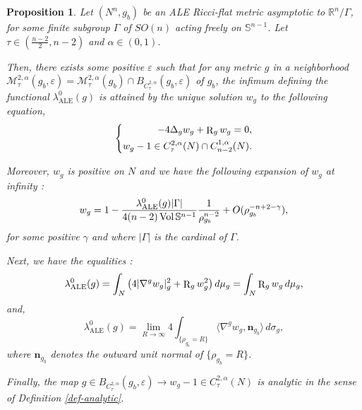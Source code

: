 \documentclass[a4paper,11pt,reqno]{amsart}
\newtheorem{prop}[defn]{Proposition}
\def\RR{\mathbb{R}}
\def\vol{\mathop{\rm vol}\nolimits}
\def\vol{\mathop{\rm Vol}\nolimits}
\def\vol{\mathop{\rm vol}\nolimits}
\def\vol{\mathop{\rm Vol}\nolimits}
\def\R{\mathop{\rm R}\nolimits}
\numberwithin{equation}{section}
\begin{document}
	\begin{prop}\label{existence propriete-wg} 
		Let $(N^n,g_b)$ be an ALE Ricci-flat metric asymptotic to $\RR^n\slash\Gamma$, for some finite subgroup $\Gamma$ of $SO(n)$ acting freely on $\mathbb{S}^{n-1}$. Let $\tau\in(\frac{n-2}{2},n-2)$ and $\alpha\in (0,1)$.
		
		Then, there exists some positive $\varepsilon$ such that for any metric $g$ in a neighborhood $\mathcal{M}^{2,\alpha}_{\tau}(g_b,\varepsilon)= \mathcal{M}^{2,\alpha}_{\tau}(g_b)\cap B_{C^{2,\alpha}_{\tau}}(g_b,\varepsilon)$ of $g_b$, the infimum defining the functional $\lambda_{\operatorname{ALE}}^0(g)$ is attained by the unique solution $w_g$ to the following equation,
		\begin{equation}
		\left\{
		\begin{aligned}
		-4\Delta_g w_g + \R_g w_g =0, \label{equ-criti-lambda}\\
		w_g-1 \in C^{2,\alpha}_{\tau}(N)\cap C^{1,\alpha}_{n-2}(N).
		\end{aligned}
		\right.
		\end{equation}
		
		Moreover, $w_g$ is positive on $N$ and we have the following expansion of $w_g$ at infinity :
		\begin{equation}
		w_g = 1 - \frac{\lambda_{\operatorname{ALE}}^0(g) |\Gamma|}{4(n-2)\vol{\mathbb{S}^{n-1}}}\frac{1}{\rho_{g_b}^{n-2}} +O(\rho_{g_b}^{-n+2-\gamma}),  \label{developpement w}
		\end{equation}
		for some positive $\gamma$ and where $|\Gamma|$ is the cardinal of $\Gamma$. 
		
		Next, we have the equalities :
		\begin{equation}
		\lambda_{\operatorname{ALE}}^0(g)=\int_N \big(4|\nabla^g w_g|_g^2 +\R_g w_g^2 \big)\,d\mu_g= \int_N \R_g w_g \,d\mu_g,\label{egalite lambda 1}
		\end{equation}
		and,
		\begin{equation}
		\lambda_{\operatorname{ALE}}^0(g) = \lim_{R\to \infty} 4\int_{\{\rho_{g_b} = R\}} \langle\nabla^gw_g,\mathbf{n}_{g_b}\rangle\, d\sigma_g,\label{egalite lambda 2}
		\end{equation}
		 where $\mathbf{n}_{g_b}$ denotes the outward unit normal of $\{\rho_{g_b}=R\}$.
		
		Finally, the map $g\in B_{C^{2,\alpha}_{\tau}}(g_b,\varepsilon)\rightarrow w_g-1\in C^{2,\alpha}_{\tau}(N)$ is analytic in the sense of Definition \ref{def-analytic}. \end{prop}
	
\end{document}
